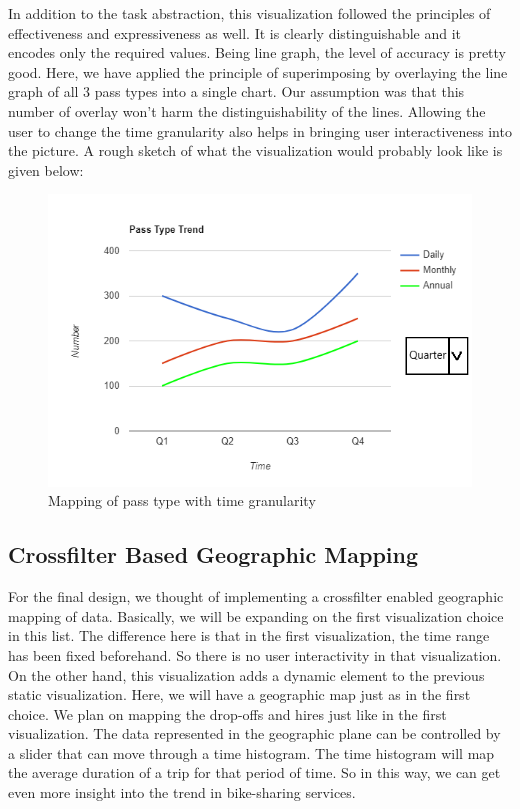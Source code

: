 In addition to the task abstraction, this visualization followed the principles of effectiveness and expressiveness as well. It is clearly distinguishable and it encodes only the required values. Being line graph, the level of accuracy is pretty good. Here, we have applied the principle of superimposing by overlaying the line graph of all 3 pass types into a single chart. Our assumption was that this number of overlay won't harm the distinguishability of the lines. Allowing the user to change the time granularity also helps in bringing user interactiveness into the picture. A rough sketch of what the visualization would probably look like is given below:
\begin{figure}[h]
	\centering %
	\includegraphics[scale=0.45]{figs/bar-graph.png}
	\caption{\footnotesize{Mapping of pass type with time granularity}}
	\label{fig:Second viz Chart}
	\captionsetup{justification=centering,margin=1cm}
	\vspace{-10pt}
\end{figure}
\newline

\subsection{Crossfilter Based Geographic Mapping}
\label{sec:viz3}

For the final design, we thought of implementing a crossfilter enabled geographic mapping of data. Basically, we will be expanding on the first visualization choice in this list. The difference here is that in the first visualization, the time range has been fixed beforehand. So there is no user interactivity in that visualization. On the other hand, this visualization adds a dynamic element to the previous static visualization. Here, we will have a geographic map just as in the first choice. We plan on mapping the drop-offs and hires just like in the first visualization. The data represented in the geographic plane can be controlled by a slider that can move through a time histogram. The time histogram will map the average duration of a trip for that period of time. So in this way, we can get even more insight into the trend in bike-sharing services.

